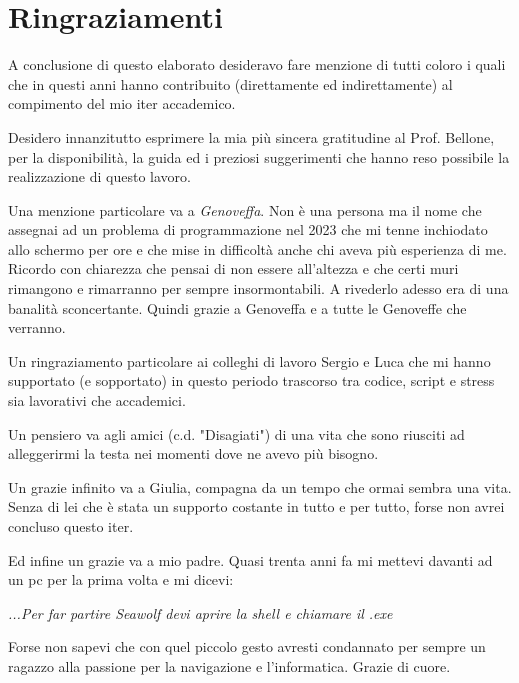 \chapter*{Ringraziamenti}

A conclusione di questo elaborato desideravo fare menzione di tutti coloro i quali che in questi anni hanno contribuito (direttamente ed indirettamente) al compimento del mio iter accademico.

Desidero innanzitutto esprimere la mia più sincera gratitudine al Prof. Bellone, per la disponibilità, la guida ed i preziosi suggerimenti che hanno reso possibile la realizzazione di questo lavoro.

Una menzione particolare va a \emph{Genoveffa}. Non è una persona ma il nome che assegnai ad un problema di programmazione nel 2023 che mi tenne inchiodato allo schermo per ore e che mise in difficoltà anche chi aveva più esperienza di me. Ricordo con chiarezza che pensai di non essere all'altezza e che certi muri rimangono e rimarranno per sempre insormontabili.
A rivederlo adesso era di una banalità sconcertante.
Quindi grazie a Genoveffa e a tutte le Genoveffe che verranno.

Un ringraziamento particolare ai colleghi di lavoro Sergio e Luca che mi hanno supportato (e sopportato) in questo periodo trascorso tra codice, script e stress sia lavorativi che accademici.

Un pensiero va agli amici (c.d. "Disagiati") di una vita che sono riusciti ad alleggerirmi la testa nei momenti dove ne avevo più bisogno.

Un grazie infinito va a Giulia, compagna da un tempo che ormai sembra una vita. Senza di lei che è stata un supporto costante in tutto e per tutto, forse non avrei concluso questo iter.

Ed infine un grazie va a mio padre. Quasi trenta anni fa mi mettevi davanti ad un pc per la prima volta e mi dicevi:

\guillemetleft \emph{...Per far partire \emph{Seawolf} devi aprire la shell e chiamare il .exe} \guillemetright

Forse non sapevi che con quel piccolo gesto avresti condannato per sempre un ragazzo alla passione per la navigazione e l'informatica.
Grazie di cuore.